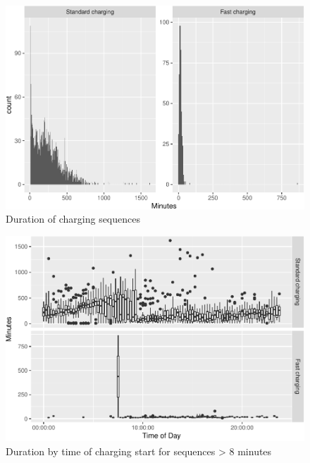 \documentclass[]{article}
\begin{document}
\begin{figure}
\centering
\includegraphics{EVBB_SummaryReport_files/figure-latex/durationHist-1.pdf}
\caption{\label{fig:durationHist}Duration of charging sequences}
\end{figure}

\begin{figure}
\centering
\includegraphics{EVBB_SummaryReport_files/figure-latex/durationTimeBox-1.pdf}
\caption{\label{fig:durationTimeBox}Duration by time of charging start for
sequences \textgreater{} 8 minutes}
\end{figure}
\end{document}
